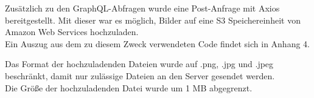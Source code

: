 Zusätzlich zu den GraphQL-Abfragen wurde eine Post-Anfrage mit Axios bereitgestellt.
Mit dieser war es möglich, Bilder auf eine S3 Speichereinheit von Amazon Web Services hochzuladen.
\\
Ein Auszug aus dem zu diesem Zweck verwendeten Code findet sich in Anhang 4.


\begin{flushleft}
Das Format der hochzuladenden Dateien wurde auf .png, .jpg und .jpeg beschränkt, damit nur zulässige Dateien an den Server gesendet werden.
\\
Die Größe der hochzuladenden Datei wurde um 1 MB abgegrenzt.
\end{flushleft}
